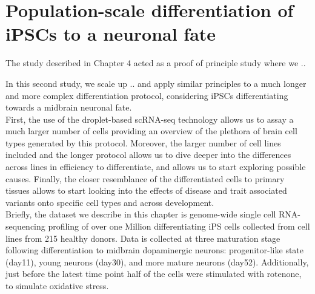 
\chapter{Population-scale differentiation of iPSCs to a neuronal fate}

The study described in Chapter 4 acted as a proof of principle study where we ..

In this second study, we scale up .. and apply similar principles to a much longer and more complex differentiation protocol, considering iPSCs differentiating towards a midbrain neuronal fate.\\

First, the use of the droplet-based scRNA-seq technology allows us to assay a much larger number of cells providing an overview of the plethora of brain cell types generated by this protocol. 
Moreover, the larger number of cell lines included and the longer protocol allows us to dive deeper into the differences across lines in efficiency to differentiate, and allows us to start exploring possible causes.
Finally, the closer resemblance of the differentiated cells to primary tissues allows to start looking into the effects of disease and trait associated variants onto specific cell types and across development. \\

Briefly, the dataset we describe in this chapter is genome-wide single cell RNA-sequencing profiling of over one Million differentiating iPS cells collected from cell lines from 215 healthy donors. 
Data is collected at three maturation stage following differentiation to midbrain dopaminergic neurons: progenitor-like state (day11), young neurons (day30), and more mature neurons (day52). 
Additionally, just before the latest time point half of the cells were stimulated with rotenone, to simulate oxidative stress. 

\newpage

